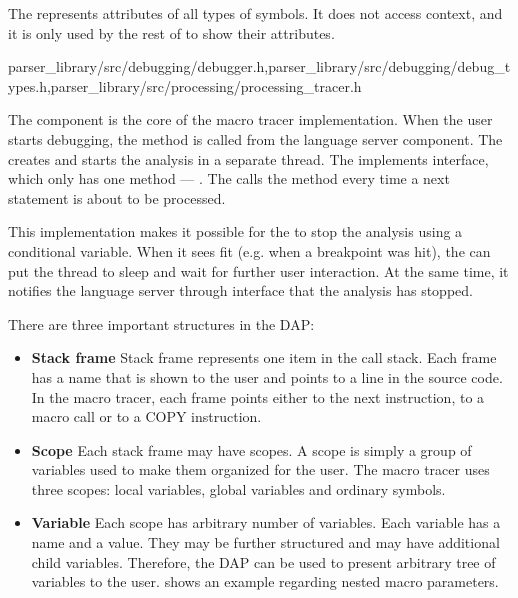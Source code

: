 The  represents attributes of all types of symbols. It does not access context, and it is only used by the rest of  to show their attributes.

{parser\_library/src/debugging/debugger.h,parser\_library/src/debugging/debug\_types.h,parser\_library/src/processing/processing\_tracer.h}

The  component is the core of the macro tracer implementation. When the user starts debugging, the method  is called from the language server component. The  creates  and starts the analysis in a separate thread. The  implements  interface, which only has one method --- . The  calls the  method every time a next statement is about to be processed.

This implementation makes it possible for the  to stop the analysis using a conditional variable. When it sees fit (e.g. when a breakpoint was hit), the  can put the thread to sleep and wait for further user interaction. At the same time, it notifies the language server through  interface that the analysis has stopped.

There are three important structures in the DAP:
\begin{itemize}
	\item \textbf{Stack frame} Stack frame represents one item in the call stack. Each frame has a name that is shown to the user and points to a line in the source code. In the macro tracer, each frame points either to the next instruction, to a macro call or to a COPY instruction.
	\item \textbf{Scope} Each stack frame may have scopes. A scope is simply a group of variables used to make them organized for the user. The macro tracer uses three scopes: local variables, global variables and ordinary symbols.
	\item \textbf{Variable} Each scope has arbitrary number of variables. Each variable has a name and a value. They may be further structured and may have additional child variables. Therefore, the DAP can be used to present arbitrary tree of variables to the user.  shows an example regarding nested macro parameters.

\end{itemize}

